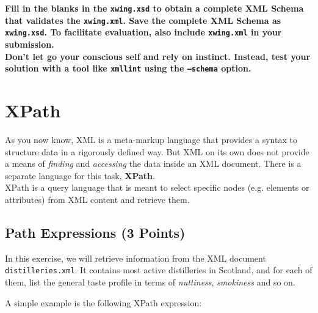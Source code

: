\documentclass[a4paper, 12pt]{scrartcl}
\begin{document}
\noindent \textbf{Fill in the blanks in the \texttt{xwing.xsd} to obtain a complete XML Schema that validates the \texttt{xwing.xml}. Save the complete XML Schema as \texttt{xwing.xsd}. To facilitate evaluation, also include \texttt{xwing.xml} in your submission.} \\

\noindent \textbf{Don't let go your conscious self and rely on instinct. Instead, test your solution with a tool like \texttt{xmllint} using the \texttt{--schema} option.}




\section{XPath}

As you now know, XML is a meta-markup language that provides a syntax to structure data in a rigorously defined way. But XML on its own does not provide a means of \textit{finding} and \textit{accessing} the data inside an XML document. There is a separate language for this task, \textbf{XPath}. \\

\noindent XPath is a query language that is meant to select specific nodes (e.g. elements or attributes) from XML content and retrieve them.

\subsection{Path Expressions (3 Points)}

In this exercise, we will retrieve information from the XML document \texttt{distilleries.xml}. It contains most active distilleries in Scotland, and for each of them, list the general taste profile in terms of \textit{nuttiness}, \textit{smokiness} and so on.

A simple example is the following XPath expression: \\
\end{document}
